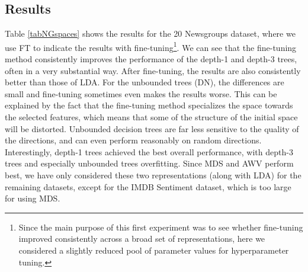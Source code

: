 \subsection{Results}

Table \ref{tabNGspaces} shows the results for the 20 Newsgroups dataset, where we use FT to indicate the results with fine-tuning\footnote{Since the main purpose of this first experiment was to see whether fine-tuning improved consistently across a broad set of representations, here we considered a slightly reduced pool of parameter values for hyperparameter tuning.}.  %
We can see that the fine-tuning method consistently improves the performance of the depth-1 and depth-3 trees, often in a very substantial way. After fine-tuning, the results are also consistently better than those of LDA. For the unbounded trees (DN), the differences are small and fine-tuning sometimes even makes the results worse. This can be explained by the fact that the fine-tuning method specializes the space towards the selected features, which means that some of the structure of the initial space will be distorted. Unbounded decision trees are far less sensitive to the quality of the directions, and can even perform reasonably on random directions.
Interestingly, depth-1 trees achieved the best overall performance, with depth-3 trees and especially unbounded trees overfitting. Since MDS and AWV perform best, we have only considered these two representations (along with LDA) for the remaining datasets, except for the IMDB Sentiment dataset, which is too large for using MDS.

